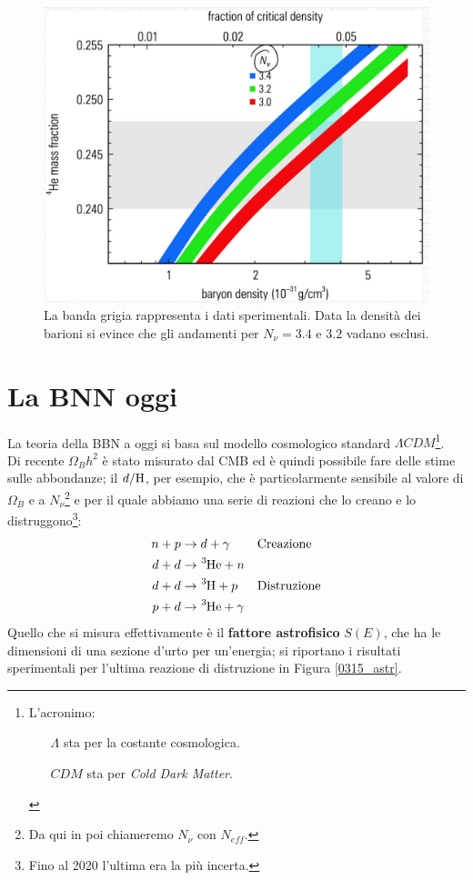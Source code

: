 \begin{figure}[h]
    \centering
    \includegraphics[scale=0.2]{Immagini/0315_heliummassfraction2.png}
    \caption{La banda grigia rappresenta i dati sperimentali. Data la densità dei barioni si evince che gli andamenti per $N_\nu = 3.4$ e $3.2$ vadano esclusi.}
    \label{0315_Hefrac2}
\end{figure}
\section{La BNN oggi}
La teoria della BBN a oggi si basa sul modello cosmologico standard $\Lambda CDM$\footnote{L'acronimo:%
\begin{itemize}
    \item[$\Lambda$] sta per la costante cosmologica.
    \item[$CDM$] sta per \textit{Cold Dark Matter}.
\end{itemize}
}.\\
Di recente $\Omega_B h^2$ è stato misurato dal CMB ed è quindi possibile fare delle stime sulle abbondanze; il $d/\ce{H}$, per esempio, che è particolarmente sensibile al valore di $\Omega_B$ e a $N_\nu$\footnote{Da qui in poi chiameremo $N_\nu$ con $N_{eff}$.} e per il quale abbiamo una serie di reazioni che lo creano e lo distruggono\footnote{Fino al 2020 l'ultima era la più incerta.}:
\begin{displaymath}
\begin{aligned}
n + p &\to d + \gamma & &\text{Creazione} \\
d + d &\to \ce{^3He} + n & \\
d + d &\to \ce{^3H}  + p &  &\text{Distruzione} \\
p + d &\to \ce{^3He} + \gamma & 
\end{aligned}
\end{displaymath}
Quello che si misura effettivamente è il \textbf{fattore astrofisico} $S(E)$, che ha le dimensioni di una sezione d'urto per un'energia; si riportano i risultati sperimentali per l'ultima reazione di distruzione in Figura \ref{0315_astr}.

